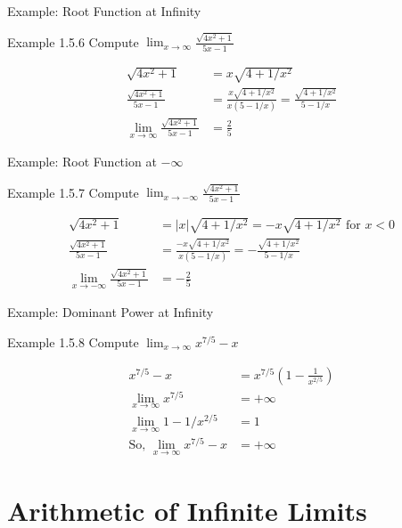 \documentclass[aspectratio=169]{beamer}
\newcommand{\limx}[2]{\lim_{x \to #1} #2}
\begin{document}
\begin{frame}{Example: Root Function at Infinity}
\begin{block}{Example 1.5.6}
Compute $\limx{\infty}{\frac{\sqrt{4x^2+1}}{5x-1}}$
\end{block}
\begin{align*}
\sqrt{4x^2+1} &= x\sqrt{4+1/x^2} \\
\frac{\sqrt{4x^2+1}}{5x-1} &= \frac{x\sqrt{4+1/x^2}}{x(5-1/x)} = \frac{\sqrt{4+1/x^2}}{5-1/x} \\
\limx{\infty}{\frac{\sqrt{4x^2+1}}{5x-1}} &= \frac{2}{5}
\end{align*}
\end{frame}

\begin{frame}{Example: Root Function at $-\infty$}
\begin{block}{Example 1.5.7}
Compute $\lim_{x \to -\infty} \frac{\sqrt{4x^2+1}}{5x-1}$
\end{block}
\begin{align*}
\sqrt{4x^2+1} &= |x|\sqrt{4+1/x^2} = -x\sqrt{4+1/x^2} \text{ for } x < 0 \\
\frac{\sqrt{4x^2+1}}{5x-1} &= \frac{-x\sqrt{4+1/x^2}}{x(5-1/x)} = -\frac{\sqrt{4+1/x^2}}{5-1/x} \\
\lim_{x \to -\infty} \frac{\sqrt{4x^2+1}}{5x-1} &= -\frac{2}{5}
\end{align*}
\end{frame}

\begin{frame}{Example: Dominant Power at Infinity}
\begin{block}{Example 1.5.8}
Compute $\limx{\infty}{x^{7/5} - x}$
\end{block}
\begin{align*}
x^{7/5} - x &= x^{7/5}\left(1-\frac{1}{x^{2/5}}\right) \\
\limx{\infty}{x^{7/5}} &= +\infty \\
\limx{\infty}{1-1/x^{2/5}} &= 1 \\
\text{So, } \limx{\infty}{x^{7/5} - x} &= +\infty
\end{align*}
\end{frame}

\section{Arithmetic of Infinite Limits}
\end{document}
